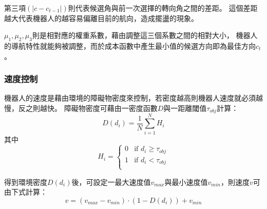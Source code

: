 第三項$(|c - c_{t-1}|)$則代表候選角與前一次選擇的轉向角之間的差距。
這個差距越大代表機器人的越容易偏離目前的航向，造成擺盪的現象。

$\mu_1,\mu_2,\mu_3$則是相對應的權重系數，藉由調整這三個系數之間的相對大小，
機器人的導航特性就能夠被調整，而於成本函數中產生最小值的候選方向即為最佳方向$c_t$。

\subsubsection{速度控制}
機器人的速度是藉由環境的障礙物密度來控制，若密度越高則機器人速度就必須越慢，反之則越快。
障礙物密度可藉由一密度函數$D$與一距離閾值$\tau_{obj}$計算：
\begin{equation}
	D(d_i) = \frac{1}{N}\sum_{i=1}^{N}H_i
\end{equation}
其中
\begin{equation}
	H_i = 
	\begin{cases}
		0	& \textrm{if } d_i \geq \tau_{obj} \\
		1	& \textrm{if } d_i < \tau_{obj} \\
	\end{cases}
\end{equation}

得到環境密度$D(d_i)$後，可設定一最大速度值$v_{max}$與最小速度值$v_{min}$，則速度$v$可由下式計算：
\begin{equation}
	v = (v_{max}-v_{min}) \cdot (1-D(d_i)) + v_{min}
\end{equation}

